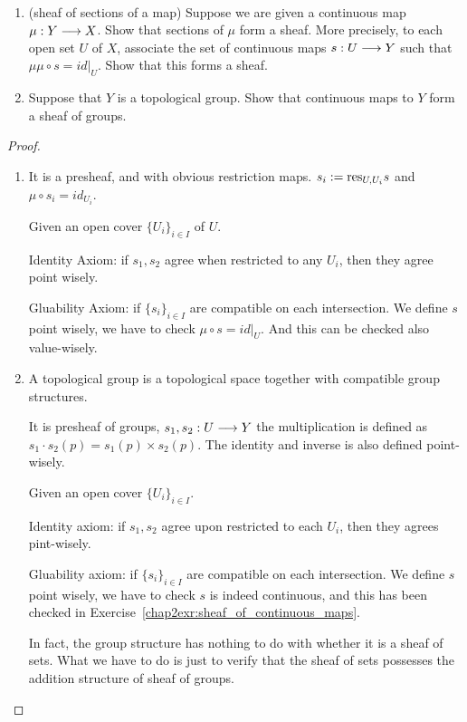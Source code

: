 \documentclass[11pt,fleqn]{book} %
\begin{document}
\begin{exr}\ 
\begin{enumerate}[label=(\alph*)]
\item 
(sheaf of sections of a map) Suppose we are given a continuous map $\mu : Y \longrightarrow X$. Show that sections of $\mu$ form a sheaf. More precisely, to each open set $U$ of $X$, associate the set of continuous maps $s: U \longrightarrow  Y$ such that $μ\mu\circ s   = id|_U$. Show that this forms a sheaf. 
\item Suppose that $Y$ is a topological group. Show that continuous maps to $Y$ form a sheaf of groups.
\end{enumerate}
\end{exr}
\begin{proof}\ 
\begin{enumerate}[label=(\alph*)]
\item It is a presheaf, and with obvious restriction maps. $s_i:=\text{res}_{U,U_i}s$ and $\mu\circ s_i=id_{U_i}$. 

Given an open cover $\{U_i\}_{i\in I}$ of $U$.

Identity Axiom:  if $s_1,s_2$ agree when restricted to any $U_i$, then they agree point wisely.

Gluability Axiom: if $\{s_i\}_{i\in I}$  are compatible on each intersection. We define $s$ point wisely, we have to check $\mu\circ s=id|_U$. And this can be checked also value-wisely.
\item A topological group is a topological space together with  compatible group structures.

It is presheaf of groups, $s_1,s_2:U\longrightarrow Y$ the multiplication is defined as $s_1 \cdot s_2(p)=s_1(p)\times s_2(p)$. The identity and inverse is also defined point-wisely. 

Given an open cover $\{U_i\}_{i\in I}$.

Identity axiom: if $s_1,s_2$ agree upon restricted to each $U_i$, then they agrees pint-wisely.

Gluability axiom: if $\{s_i\}_{i\in I}$  are compatible on each intersection. We define $s$ point wisely, we have to check $s$ is indeed continuous, and this has been checked in Exercise~\ref{chap2exr:sheaf_of_continuous_maps}.

 In fact, the group structure has nothing to do with whether it is a sheaf of sets.
 What we have to do is just to verify that the sheaf of sets possesses the addition structure of sheaf of groups.
\end{enumerate}
\end{proof}
\end{document}
